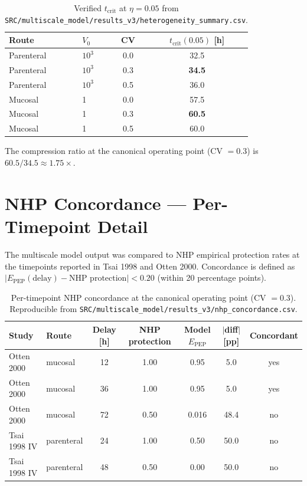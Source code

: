 \documentclass[11pt]{article}
\theoremstyle{definition}
\theoremstyle{remark}
\newcommand{\Epep}{E_{\text{PEP}}}
\newcommand{\tcrit}{t_{\text{crit}}}
\begin{document}
\begin{table}[H]
\centering
\small
\caption{Verified $\tcrit$ at $\eta = 0.05$ from \texttt{SRC/multiscale\_model/results\_v3/heterogeneity\_summary.csv}.}
\begin{tabular}{@{}llcc@{}}
\toprule
\textbf{Route} & \textbf{$V_{0}$} & \textbf{CV} & \textbf{$\tcrit(0.05)$ [h]} \\
\midrule
Parenteral  & $10^{3}$ & 0.0 & 32.5 \\
Parenteral  & $10^{3}$ & 0.3 & \textbf{34.5} \\
Parenteral  & $10^{3}$ & 0.5 & 36.0 \\
Mucosal     & 1        & 0.0 & 57.5 \\
Mucosal     & 1        & 0.3 & \textbf{60.5} \\
Mucosal     & 1        & 0.5 & 60.0 \\
\bottomrule
\end{tabular}
\end{table}

The compression ratio at the canonical operating point (CV $= 0.3$) is $60.5/34.5 \approx 1.75\times$.

\section{NHP Concordance --- Per-Timepoint Detail}

The multiscale model output was compared to NHP empirical protection rates at the timepoints reported in Tsai 1998\cite{tsai1995_si} and Otten 2000\cite{otten2000_si}. Concordance is defined as $|\Epep(\text{delay}) - \text{NHP protection}| < 0.20$ (within 20 percentage points).

\begin{table}[H]
\centering
\small
\caption{Per-timepoint NHP concordance at the canonical operating point (CV $= 0.3$). Reproducible from \texttt{SRC/multiscale\_model/results\_v3/nhp\_concordance.csv}.}
\begin{tabular}{@{}llccccc@{}}
\toprule
\textbf{Study} & \textbf{Route} & \textbf{Delay [h]} & \textbf{NHP protection} & \textbf{Model $\Epep$} & \textbf{$|$diff$|$ [pp]} & \textbf{Concordant} \\
\midrule
Otten 2000      & mucosal    & 12 & 1.00 & 0.95 & 5.0  & yes \\
Otten 2000      & mucosal    & 36 & 1.00 & 0.95 & 5.0  & yes \\
Otten 2000      & mucosal    & 72 & 0.50 & 0.016 & 48.4 & no  \\
Tsai 1998 IV    & parenteral & 24 & 1.00 & 0.50 & 50.0 & no  \\
Tsai 1998 IV    & parenteral & 48 & 0.50 & 0.00 & 50.0 & no  \\
\bottomrule
\end{tabular}
\end{table}
\end{document}
